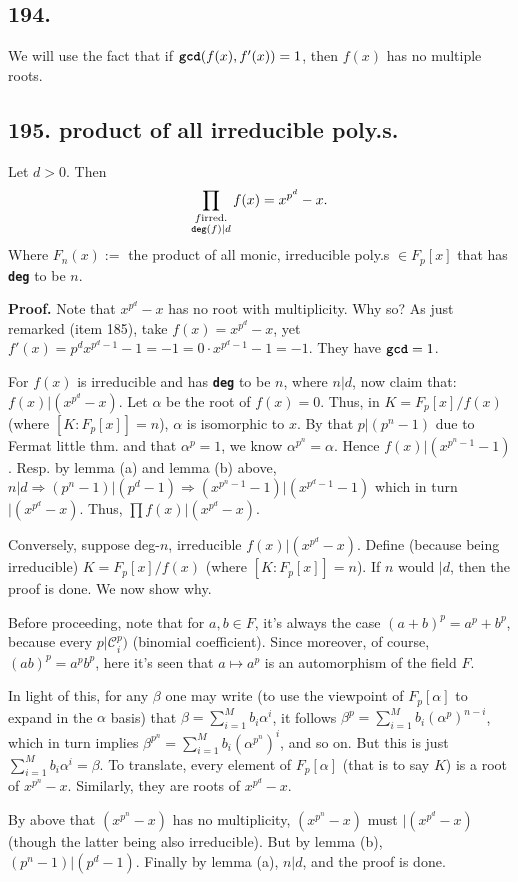 \documentclass[12pt]{article}
\newcommand\aG\alpha \newcommand\bG\beta  \newcommand\gG\gamma \newcommand\dG\delta \newcommand\eG\varepsilon \newcommand\zG\zeta \newcommand\tG\vartheta \newcommand\kG\kappa \newcommand\lG\lambda \newcommand\sG\sigma \newcommand\fG\varphi \newcommand\oG\omega
\newcommand\M\cdot%
\newcommand\Mp\mapsto%
\newcommand{\Ip}{\Rightarrow} %
\newcommand{\CF}[1]{ \mathcal{#1} }%
\newcommand{\Ss}[1]{\textsf{\bfseries{#1}}}%
\newcommand{\Tw}[1]{\texttt{\bfseries{#1}}}%
\newcommand{\EqGo}[1]{ \begin{gather*}{#1}\end{gather*} } %
\begin{document}
\subsection*{194.} We will use the fact that if \(\Tw{gcd}(f(x),f'(x)) =1\), then \(f(x)\) has no multiple roots. 

\subsection*{195. product of all irreducible poly.s.} Let \(d>0\). Then \EqGo{
 \prod_{\substack{ f \mathrm{irred.} \\ \Tw{deg}(f)|d }} f(x) = x^{p^d} -x.
} Where \(F_n(x) :=\) the product of all monic, irreducible poly.s \(\in F_p[x]\) that has \Tw{deg} to be \(n\). \par
\Ss{Proof.} Note that \(x^{p^d}-x\) has no root with multiplicity. 
Why so? As just remarked (item 185), take \(f(x)= x^{p^d} -x\), yet \(f'(x)= p^d x^{p^d-1} -1 =-1 = 0 \M x^{p^d-1} -1 = -1\). 
They have \(\Tw{gcd} =1\). \par
For \(f(x)\) is irreducible and has \Tw{deg} to be \(n\), where \(n \Big| d\), now claim that: \(f(x) \Big| (x^{p^d}-x)\). 
Let \(\aG\) be the root of \(f(x) =0\). 
Thus, in \(K =F_p[x]/f(x)\) (where \([K:F_p[x]] =n\)), \(\aG\) is isomorphic to \(x\). 
By that \(p \Big| (p^n-1)\) due to Fermat little thm. and that \(\aG^p =1\), we know \(\aG^{p^n} =\aG\). 
Hence \(f(x) \Big| (x^{p^n -1} -1)\). 
Resp. by lemma (a) and lemma (b) above, \(n|d \Ip (p^n -1)|(p^d -1) \Ip (x^{p^n-1} -1)|(x^{p^d-1} -1)\) which in turn \(|(x^{p^d} -x)\). 
Thus, \(\prod f(x) \Big| (x^{p^d} -x)\). \par
Conversely, suppose deg-\(n\), irreducible \(f(x) \Big| (x^{p^d} -x)\). 
Define (because being irreducible) \(K =F_p[x]/f(x)\) (where \([K:F_p[x]] =n\)). 
If \(n\) would \(\Big| d\), then the proof is done. We now show why. \par
Before proceeding, note that for \(a,b \in F\), it's always the case \((a+b)^p =a^p +b^p\), 
because every \(p \Big| \CF{C}_i^p)\) (binomial coefficient). 
Since moreover, of course, \((ab)^p = a^p b^p\), 
here it's seen that \(a \Mp a^p\) is an automorphism of the field \(F\). \par
In light of this, for any \(\bG\) one may write (to use the viewpoint of \(F_p[\aG]\) to expand in the \(\aG\) basis) that \(\bG= \sum_{i=1}^M b_i \aG^i\), 
it follows \(\bG^p= \sum_{i=1}^M b_i (\aG^p)^{n-i}\), 
which in turn implies \(\bG^{p^n}= \sum_{i=1}^M b_i (\aG^{p^n})^i\), and so on. 
But this is just \(\sum_{i=1}^M b_i \aG^i =\bG\). 
To translate, every element of \(F_p[\aG]\) (that is to say \(K\)) is a root of \(x^{p^n} -x\). 
Similarly, they are roots of \(x^{p^d} -x\). \par
By above that \((x^{p^n} -x)\) has no multiplicity, \((x^{p^n} -x)\) must \(\Big| (x^{p^d} -x)\) (though the latter being also irreducible). 
But by lemma (b), \((p^n -1)|(p^d -1)\). 
Finally by lemma (a), \(n|d\), and the proof is done. 
\end{document}
